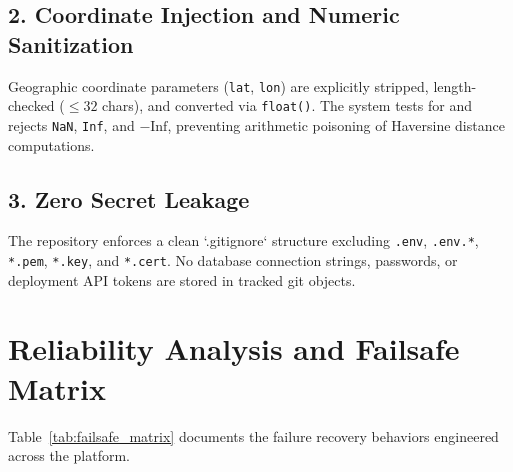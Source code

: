 \documentclass[11pt,a4paper,oneside]{report}
\begin{document}
\subsection{2. Coordinate Injection and Numeric Sanitization}
Geographic coordinate parameters (\texttt{lat}, \texttt{lon}) are explicitly stripped, length-checked ($\le 32$ chars), and converted via \texttt{float()}. The system tests for and rejects \texttt{NaN}, \texttt{Inf}, and $- \text{Inf}$, preventing arithmetic poisoning of Haversine distance computations.

\subsection{3. Zero Secret Leakage}
The repository enforces a clean `.gitignore` structure excluding \texttt{.env}, \texttt{.env.*}, \texttt{*.pem}, \texttt{*.key}, and \texttt{*.cert}. No database connection strings, passwords, or deployment API tokens are stored in tracked git objects.

\section{Reliability Analysis and Failsafe Matrix}
Table~\ref{tab:failsafe_matrix} documents the failure recovery behaviors engineered across the platform.
\end{document}
